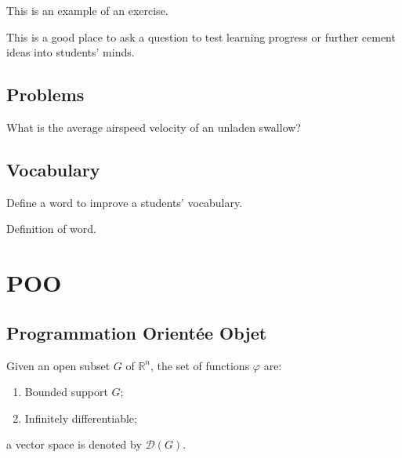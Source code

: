 \documentclass[11pt,fleqn]{book} %
\begin{document}
This is an example of an exercise.

\begin{exercise}
This is a good place to ask a question to test learning progress or further cement ideas into students' minds.
\end{exercise}


\section{Problems}

\begin{problem}
What is the average airspeed velocity of an unladen swallow?
\end{problem}


\section{Vocabulary}

Define a word to improve a students' vocabulary.

\begin{vocabulary}[Word]
Definition of word.
\end{vocabulary}


\chapter{POO}

\section{Programmation Orientée Objet}
\begin{notation}
Given an open subset $G$ of $\mathbb{R}^n$, the set of functions $\varphi$ are:
\begin{enumerate}
\item Bounded support $G$;
\item Infinitely differentiable;
\end{enumerate}
a vector space is denoted by $\mathcal{D}(G)$. 
\end{notation}
\end{document}
